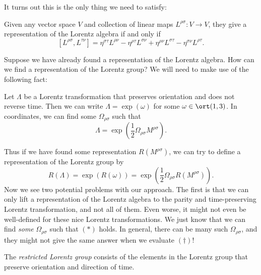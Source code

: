 \documentclass[a4paper]{article}
\begin{document}
It turns out this is the only thing we need to satisfy:
\begin{fact}
  Given any vector space $V$ and collection of linear maps $L^{\rho\sigma}: V \to V$, they give a representation of the Lorentz algebra if and only if
  \[
    [L^{\rho\sigma}, L^{\tau\nu}] = \eta^{\sigma\tau} L^{\rho\nu} - \eta^{\rho\tau} L^{\sigma\nu} + \eta^{\rho\nu}L^{\sigma\tau} - \eta^{\sigma\nu}L^{\rho\tau}.
  \]
\end{fact}
Suppose we have already found a representation of the Lorentz algebra. How can we find a representation of the Lorentz group? We will need to make use of the following fact:
\begin{fact}
  Let $\Lambda$ be a Lorentz transformation that preserves orientation and does not reverse time. Then we can write $\Lambda = \exp(\omega)$ for some $\omega \in \ort(1, 3)$. In coordinates, we can find some $\Omega_{\rho\sigma}$ such that
  \[
    \Lambda = \exp\left(\frac{1}{2} \Omega_{\rho\sigma} M^{\rho\sigma}\right).\tag{$*$}
  \]
\end{fact}
Thus if we have found some representation $R(M^{\rho\sigma})$, we can try to define a representation of the Lorentz group by
\[
  R(\Lambda) = \exp(R(\omega)) = \exp \left(\frac{1}{2} \Omega_{\rho\sigma} R(M^{\rho\sigma})\right).\tag{$\dagger$}
\]
Now we see two potential problems with our approach. The first is that we can only lift a representation of the Lorentz algebra to the parity and time-preserving Lorentz transformation, and not all of them. Even worse, it might not even be well-defined for these nice Lorentz transformations. We just know that we can find \emph{some} $\Omega_{\rho\sigma}$ such that $(*)$ holds. In general, there can be many such $\Omega_{\rho\sigma}$, and they might not give the same answer when we evaluate $(\dagger)$!

\begin{defi}
  The \emph{restricted Lorentz group} consists of the elements in the Lorentz group that preserve orientation and direction of time.
\end{defi}
\end{document}
